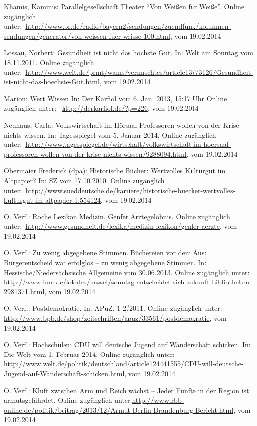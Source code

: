\documentclass[a4paper,
fontsize=11pt,
oneside,
numbers=noperiodatend,
parskip=half-,
bibliography=totoc,
final
]{scrartcl}
\begin{document}
Khamis, Kammis: Parallelgesellschaft Theater \enquote{Von Weißen für
Weiße}. Online zugänglich
unter:~\url{http://www.br.de/radio/bayern2/sendungen/zuendfunk/kolumnen-sendungen/generator/von-weissen-fuer-weisse-100.html},
vom 19.02.2014~

Lossau, Norbert: Gesundheit ist nicht das höchste Gut. In: Welt am
Sonntag vom 18.11.2011. Online zugänglich
unter:~\url{http://www.welt.de/print/wams/vermischtes/article13773126/Gesundheit-ist-nicht-das-hoechste-Gut.html},
vom 19.02.2014

Marion: Wert Wissen In: Der Karfiol vom 6. Jan. 2013, 15:17 Uhr Online
zugänglich unter:~ \url{http://derkarfiol.de/?p=226}, vom 19.02.2014~

Neuhaus, Carla: Volkswirtschaft im Hörsaal Professoren wollen von der
Krise nichts wissen. In: Tagesspiegel vom 5. Januar 2014. Online
zugänglich
unter:~\url{http://www.tagesspiegel.de/wirtschaft/volkswirtschaft-im-hoersaal-professoren-wollen-von-der-krise-nichts-wissen/9288094.html},
vom 19.02.2014

Obermaier Frederick (dpa): Historische Bücher: Wertvolles Kulturgut im
Altpapier? In: SZ vom 17.10.2010. Online zugänglich
unter:~\url{http://www.sueddeutsche.de/karriere/historische-buecher-wertvolles-kulturgut-im-altpapier-1.554124},
vom 19.02.2014

O. Verf.: Roche Lexikon Medizin. Genfer Ärztegelöbnis. Online zugänglich
unter:~\url{http://www.gesundheit.de/lexika/medizin-lexikon/genfer-aerzte},
vom 19.02.2014~

O. Verf.: Zu wenig abgegebene Stimmen. Büchereien vor dem Aus:
Bürgerentscheid war erfolglos -- zu wenig abgegebene Stimmen. In:
Hessische/Niedersächsische Allgemeine vom 30.06.2013. Online zugänglich
unter:
\url{http://www.hna.de/lokales/kassel/sonntag-entscheidet-sich-zukunft-bibliotheken-2981371.html},
vom 19.02.2014

O. Verf.: Postdemokratie. In: APuZ, 1-2/2011. Online zugänglich unter:~
\url{http://www.bpb.de/shop/zeitschriften/apuz/33561/postdemokratie},
vom 19.02.2014

O. Verf.: Hochschulen: CDU will deutsche Jugend auf Wanderschaft
schicken. In: Die Welt vom 1. Februar 2014. Online zugänglich unter:~
\url{http://www.welt.de/politik/deutschland/article124441555/CDU-will-deutsche-Jugend-auf-Wanderschaft-schicken.html},
vom 19.02.2014

O. Verf.: Kluft zwischen Arm und Reich wächst -- Jeder Fünfte in der
Region ist armutsgefährdet. Online zugänglich
unter:\url{http://www.rbb-online.de/politik/beitrag/2013/12/Armut-Berlin-Brandenburg-Bericht.html},
vom 19.02.2014
\end{document}
